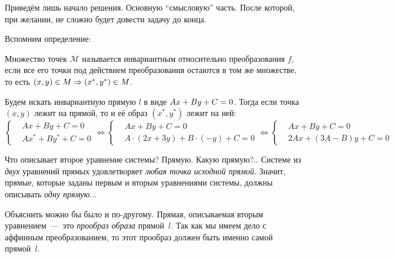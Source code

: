 \documentclass[a4paper,12pt]{article}
\begin{document}
  \begin{solution}
    Приведём лишь начало решения.
    Основную ``смысловую'' часть.
    После которой, при желании, не сложно будет довести задачу до конца.
    
    Вспомним определение:
    
    \begin{definition}
      Множество точек $\mathcal M$ называется инвариантным относительно преобразования $f$, если все его точки под действием преобразования остаются в том же множестве, то есть $(x, y) \hm\in M \hm\Rightarrow (x^*, y^*) \hm\in M$.
    \end{definition}
    
    
    Будем искать инвариантную прямую $l$ в виде $Ax \hm+ By \hm+ C \hm= 0$.
    Тогда если точка $(x, y)$ лежит на прямой, то и её образ $(x^*, y^*)$ лежит на ней:
    \[
      \left\{
        \begin{aligned}
          &Ax + By + C = 0\\
          &Ax^* + By^* + C = 0
        \end{aligned}
      \right.
      \Leftrightarrow
      \left\{
        \begin{aligned}
          &Ax + By + C = 0\\
          &A\cdot (2x + 3y) + B\cdot (-y) + C = 0
        \end{aligned}
      \right.
      \Leftrightarrow
      \left\{
        \begin{aligned}
          &Ax + By + C = 0\\
          &2Ax + (3A - B)y + C = 0
        \end{aligned}
      \right.
    \]
    
    Что описывает второе уравнение системы?
    Прямую.
    Какую прямую?..
    Системе из \emph{двух} уравнений прямых удовлетворяет \emph{любая точка исходной прямой}.
    Значит, прямые, которые заданы первым и вторым уравнениями системы, должны описывать \emph{одну прямую}...
    
    Объяснить можно бы было и по-другому.
    Прямая, описываемая вторым уравнением~---~это \emph{прообраз образа} прямой~$l$.
    Так как мы имеем дело с аффинным преобразованием, то этот прообраз должен быть именно самой прямой~$l$.
    

\end{solution}
\end{document}
